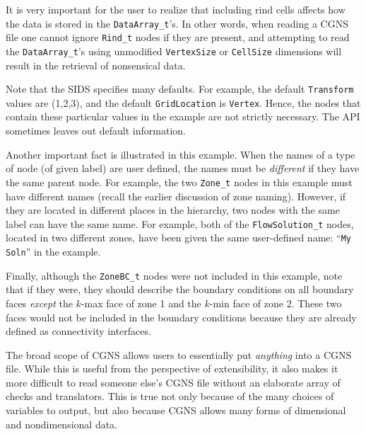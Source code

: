 \documentclass[12pt]{article}
\renewcommand{\appendix}{%
   \newcommand{\app}{%
      \secdef\Appendix\sAppendix}%
   \newcommand{\subapp}{%
      \secdef\subAppendix\subsAppendix}%
   \newcommand{\subsubapp}{%
      \secdef\subsubAppendix\subsubsAppendix}%
   \newcounter{app}%
   \newcounter{subapp}[app]%
   \newcounter{subsubapp}[app]%
   \renewcommand{\theapp}{\Alph{app}}%
   \renewcommand{\thesubapp}{\theapp.\arabic{subapp}}%
   \renewcommand{\thesubsubapp}{\thesubapp.\arabic{subsubapp}}%
   \renewcommand{\sectionmark}[1]{\markright{\theapp\ \ ##1}}
 }
\newcommand{\Appendix}[2][?]{%
   \refstepcounter{app}%
   \addcontentsline{toc}{section}%
      {\protect\bfseries{\appendixname~\theapp.\ \ } #1}%
   {\noindent\Large\bfseries\appendixname\ \theapp.\ \ #2\par}%
   \sectionmark{#1}\vspace{\baselineskip}}
\newcommand{\sAppendix}[1]{%
   \refstepcounter{app}%
   {\noindent\Large\bfseries\appendixname\ \theapp.\ \ #1\par}%
   \vspace{\baselineskip}}
\newcommand{\subAppendix}[2][?]{%
   \refstepcounter{subapp}%
   \addcontentsline{toc}{subsection}%
       {\thesubapp\ \ #1}%
   \vspace{\baselineskip}
   {\noindent\large\bfseries\thesubapp\ \ #2\par}%
   \vspace{\baselineskip}}
\newcommand{\subsAppendix}[1]{%
   \refstepcounter{subapp}%
   \vspace{\baselineskip}
   {\noindent\large\bfseries\thesubapp\ \ #1\par}%
   \vspace{\baselineskip}}
\newcommand{\subsubAppendix}[2][?]{%
   \refstepcounter{subsubapp}%
   \addcontentsline{toc}{subsubsection}%
       {\thesubsubapp\ \ #1}%
   \vspace{\baselineskip}
   {\noindent\large\bfseries\thesubsubapp\ \ #2\par}%
   \vspace{\baselineskip}}
\newcommand{\subsubsAppendix}[1]{%
   \refstepcounter{subsubapp}%
   \vspace{\baselineskip}
   {\noindent\large\bfseries\thesubsubapp\ \ #1\par}%
   \vspace{\baselineskip}}
\begin{document}
It is very important for the user to realize that including rind 
cells affects how the data is stored in the {\tt DataArray\_t}'s.
In other words, when reading a CGNS file one cannot ignore
{\tt Rind\_t} nodes if they are present, and attempting to read
the {\tt DataArray\_t}'s using unmodified {\tt VertexSize} or 
{\tt CellSize} dimensions
will result in the retrieval of nonsensical data.

Note that the SIDS specifies many defaults.  For example, the
default {\tt Transform} values are (1,2,3), and the default
{\tt GridLocation} is {\tt Vertex}.  
Hence, the nodes that contain these particular
values in the example are not strictly necessary.
The API sometimes leaves out default information.

Another important fact is illustrated in this example.  When the names
of a type of node (of given label) are user defined, 
the names must be {\it different} if they
have the same parent node.  For example,
the two {\tt Zone\_t} nodes in this example must have different
names (recall the earlier discussion of zone naming).
However, if they are located in different places in the hierarchy, two
nodes with the same label can have the same name.  For example, 
both of the {\tt FlowSolution\_t} nodes, located in two different
zones, have been given the same user-defined
name:  ``{\tt My Soln}'' in the example.

Finally, although the {\tt ZoneBC\_t} nodes were not included in this
example, note that if they were, they should describe the boundary
conditions on all boundary faces {\it except} the 
$k$-max face of zone 1 and the $k$-min face of zone 2.  These
two faces would not be included in the boundary conditions because they
are already defined as connectivity interfaces.


\newpage
  \label{sec:plot3d}

The broad scope of CGNS allows users to essentially
put {\it anything} into a CGNS file.  While this is useful from the
perspective of extensibility, it also makes it more difficult
to read someone else's CGNS file without an elaborate
array of checks and translators.  This is true
not only because of the many choices of variables to output, but also
because CGNS allows many forms of dimensional and nondimensional
data.
\end{document}
